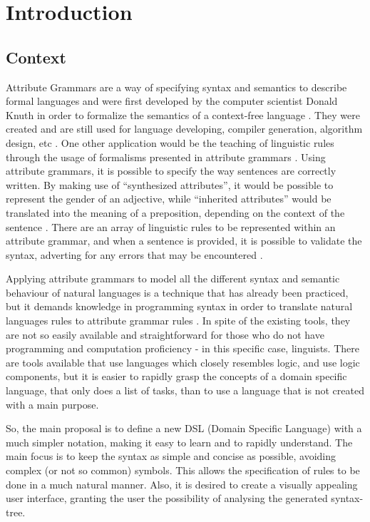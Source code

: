 \chapter{Introduction} \label{introduction}
	
\section{Context}
Attribute Grammars are a way of specifying syntax and semantics to describe formal languages \cite{hafiz_2011} and were first developed by the computer scientist Donald Knuth in order to formalize the semantics of a context-free language \cite{slonneger_1995}. They were created and are still used for language developing, compiler generation, algorithm design, etc \cite{thirunarayan_2009}. One other application would be the teaching of linguistic rules through the usage of formalisms presented in attribute grammars \cite{horakova_2014}. Using attribute grammars, it is possible to specify the way sentences are correctly written. By making use of ``synthesized attributes'', it would be possible to represent the gender of an adjective, while ``inherited attributes'' would be translated into the meaning of a preposition, depending on the context of the sentence \cite{donald_1990}.
There are an array of linguistic rules to be represented within an attribute grammar, and when a sentence is provided, it is possible to validate the syntax, adverting for any errors that may be encountered \cite{barros_2017}.

Applying attribute grammars to model all the different syntax and semantic behaviour of natural languages is a technique that has already been practiced, but it demands knowledge in programming syntax in order to translate natural languages rules to attribute grammar rules \cite{hafiz_2011}. In spite of the existing tools, they are not so easily available and straightforward for those who do not have programming and computation proficiency - in this specific case, linguists. There are tools available that use languages which closely resembles logic, and use logic components, but it is easier to rapidly grasp the concepts of a domain specific language, that only does a list of tasks, than to use a language that is not created with a main purpose.
    
So, the main proposal is to define a new \textsc{DSL} (Domain Specific Language) with a much simpler notation, making it easy to learn and to rapidly understand. The main focus is to keep the syntax as simple and concise as possible, avoiding complex (or not so common) symbols. This allows the specification of rules to be done in a much natural manner. Also, it is desired to create a visually appealing user interface, granting the user the possibility of analysing the generated syntax-tree.

